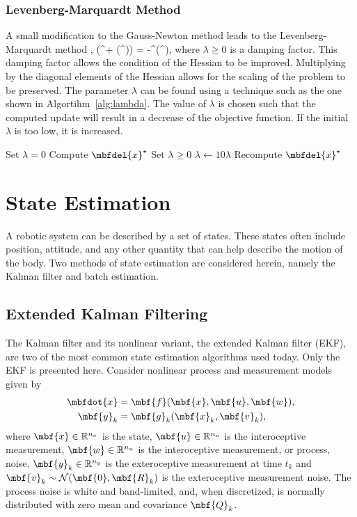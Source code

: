 \subsubsection{Levenberg-Marquardt Method}
A small modification to the Gauss-Newton method leads to the Levenberg-Marquardt method \cite{Levenberg1944, Marquardt1962, Roweis1996},
\bdis
	\left(^\trans + \lambda {}(^\trans)\right)  = -^\trans\mbs{\rho}(^\op),
\edis
where $\lambda \geq 0$ is a damping factor. This damping factor allows the condition of the Hessian to be improved. Multiplying by the diagonal elements of the Hessian allows for the scaling of the problem to be preserved. The parameter $\lambda$ can be found using a technique such as the one shown in Algortihm~\ref{alg:lambda}. The value of $\lambda$ is chosen such that the computed update will result in a decrease of the objective function. If the initial $\lambda$ is too low, it is increased. 
\begin{algorithm}[H]
\singlespacing
\caption{}\label{alg:lambda}
\begin{algorithmic}[1]
\State Set $\lambda = 0$
\State Compute $\mbfdel{x}^\star$
\State Set $\lambda \geq 0 $
	\State $\lambda \gets 10\lambda$
	\State Recompute $\mbfdel{x}^\star$
\EndWhile
\end{algorithmic}
\end{algorithm}

\section{State Estimation}

A robotic system can be described by a set of states. These states often include position, attitude, and any other quantity that can help describe the motion of the body. Two methods of state estimation are considered herein, namely the Kalman filter and  batch estimation.

\subsection{Extended Kalman Filtering}

The Kalman filter and its nonlinear variant, the extended Kalman filter (EKF), are two of the most common state estimation algorithms used today. Only the EKF is presented here. Consider nonlinear process and measurement models given by
\begin{align}
	\mbfdot{x} &= \mbf{f}(\mbf{x},\mbf{u},\mbf{w}), \label{eq:pre_f} \\
	\mbf{y}_k &= \mbf{g}_k(\mbf{x}_k,\mbf{v}_k) \label{eq:pre_g},
\end{align}
where $\mbf{x} \in \mathbb{R}^{n_x}$ is the state, $\mbf{u} \in \mathbb{R}^{n_u}$ is the interoceptive measurement,  $\mbf{w} \in \mathbb{R}^{n_u}$ is the interoceptive measurement, or process, noise, $\mbf{y}_k \in \mathbb{R}^{n_y}$ is the exteroceptive measurement at time $t_k$ and $\mbf{v}_k \sim \mathcal{N}(\mbf{0},\mbf{R}_k)$  is the exteroceptive measurement noise. The process noise is white and band-limited, and, when discretized, is normally distributed with zero mean and covariance $\mbf{Q}_k$. 

